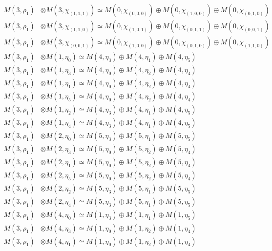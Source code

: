 \begin{align*}
M(3,\rho_{1}) &\otimes M(3,\chi_{(1,1,1)}) \simeq M(0,\chi_{(0,0,0)}) \oplus M(0,\chi_{(1,0,0)}) \oplus M(0,\chi_{(0,1,0)})\\
M(3,\rho_{1}) &\otimes M(3,\chi_{(1,1,0)}) \simeq M(0,\chi_{(1,0,1)}) \oplus M(0,\chi_{(0,1,1)}) \oplus M(0,\chi_{(0,0,1)})\\
M(3,\rho_{1}) &\otimes M(3,\chi_{(0,0,1)}) \simeq M(0,\chi_{(1,0,0)}) \oplus M(0,\chi_{(0,1,0)}) \oplus M(0,\chi_{(1,1,0)})\\
M(3,\rho_{1}) &\otimes M(1,\eta_{0}) \simeq M(4,\eta_{3}) \oplus M(4,\eta_{1}) \oplus M(4,\eta_{5})\\
M(3,\rho_{1}) &\otimes M(1,\eta_{3}) \simeq M(4,\eta_{0}) \oplus M(4,\eta_{2}) \oplus M(4,\eta_{4})\\
M(3,\rho_{1}) &\otimes M(1,\eta_{1}) \simeq M(4,\eta_{0}) \oplus M(4,\eta_{2}) \oplus M(4,\eta_{4})\\
M(3,\rho_{1}) &\otimes M(1,\eta_{5}) \simeq M(4,\eta_{0}) \oplus M(4,\eta_{2}) \oplus M(4,\eta_{4})\\
M(3,\rho_{1}) &\otimes M(1,\eta_{2}) \simeq M(4,\eta_{3}) \oplus M(4,\eta_{1}) \oplus M(4,\eta_{5})\\
M(3,\rho_{1}) &\otimes M(1,\eta_{4}) \simeq M(4,\eta_{3}) \oplus M(4,\eta_{1}) \oplus M(4,\eta_{5})\\
M(3,\rho_{1}) &\otimes M(2,\eta_{0}) \simeq M(5,\eta_{3}) \oplus M(5,\eta_{1}) \oplus M(5,\eta_{5})\\
M(3,\rho_{1}) &\otimes M(2,\eta_{3}) \simeq M(5,\eta_{0}) \oplus M(5,\eta_{2}) \oplus M(5,\eta_{4})\\
M(3,\rho_{1}) &\otimes M(2,\eta_{1}) \simeq M(5,\eta_{0}) \oplus M(5,\eta_{2}) \oplus M(5,\eta_{4})\\
M(3,\rho_{1}) &\otimes M(2,\eta_{5}) \simeq M(5,\eta_{0}) \oplus M(5,\eta_{2}) \oplus M(5,\eta_{4})\\
M(3,\rho_{1}) &\otimes M(2,\eta_{2}) \simeq M(5,\eta_{3}) \oplus M(5,\eta_{1}) \oplus M(5,\eta_{5})\\
M(3,\rho_{1}) &\otimes M(2,\eta_{4}) \simeq M(5,\eta_{3}) \oplus M(5,\eta_{1}) \oplus M(5,\eta_{5})\\
M(3,\rho_{1}) &\otimes M(4,\eta_{0}) \simeq M(1,\eta_{3}) \oplus M(1,\eta_{1}) \oplus M(1,\eta_{5})\\
M(3,\rho_{1}) &\otimes M(4,\eta_{3}) \simeq M(1,\eta_{0}) \oplus M(1,\eta_{2}) \oplus M(1,\eta_{4})\\
M(3,\rho_{1}) &\otimes M(4,\eta_{1}) \simeq M(1,\eta_{0}) \oplus M(1,\eta_{2}) \oplus M(1,\eta_{4})\\

\end{align*}
